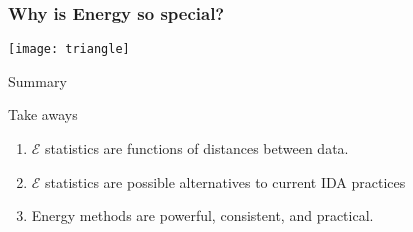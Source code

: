 \documentclass[presentation]{beamer}
\begin{document}
\begin{frame}
  \frametitle{Why is Energy so special?}
  \begin{center}
    \centering
    \texttt{[image: triangle]}
  \end{center}
\end{frame}

\begin{frame}{Summary}
  \begin{block}{Take aways}
    \begin{enumerate}
    \item $\mathcal{E}$ statistics are functions of distances between data.
    \item $\mathcal{E}$ statistics are possible alternatives to
      current IDA practices
    \item Energy methods are powerful, consistent, and practical.
    \end{enumerate}
  \end{block}
\end{frame}
\end{document}
